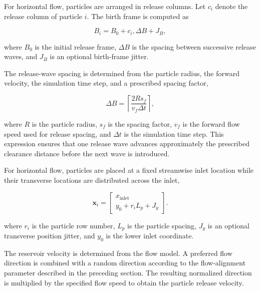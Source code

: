 For horizontal flow, particles are arranged in release
columns. Let $c_i$ denote the release column of particle
$i$. The birth frame is computed as

\begin{equation}
B_i=B_0+c_i,\Delta B+J_B ,
\end{equation}

where $B_0$ is the initial release frame,
$\Delta B$ is the spacing between successive release
waves, and $J_B$ is an optional birth-frame jitter.

The release-wave spacing is determined from the
particle radius, the forward velocity, the simulation
time step, and a prescribed spacing factor,

\begin{equation}
\Delta B=\left\lceil\frac{2Rs_f}{v_f\Delta t}\right\rceil ,
\end{equation}

where $R$ is the particle radius,
$s_f$ is the spacing factor,
$v_f$ is the forward flow speed used for release
spacing, and $\Delta t$ is the simulation time step.
This expression ensures that one release wave advances
approximately the prescribed clearance distance before
the next wave is introduced.

For horizontal flow, particles are placed at a fixed
streamwise inlet location while their transverse
locations are distributed across the inlet,

\begin{equation}
\mathbf{x}_i =\begin{bmatrix}x_{\mathrm{inlet}} \\y_0 + r_iL_p + J_y\end{bmatrix}.
\end{equation}

where $r_i$ is the particle row number,
$L_p$ is the particle spacing,
$J_y$ is an optional transverse position jitter,
and $y_0$ is the lower inlet coordinate.

The reservoir velocity is determined from the flow
model. A preferred flow direction is combined with a
random direction according to the flow-alignment
parameter described in the preceding section. The
resulting normalized direction is multiplied by the
specified flow speed to obtain the particle release
velocity.
